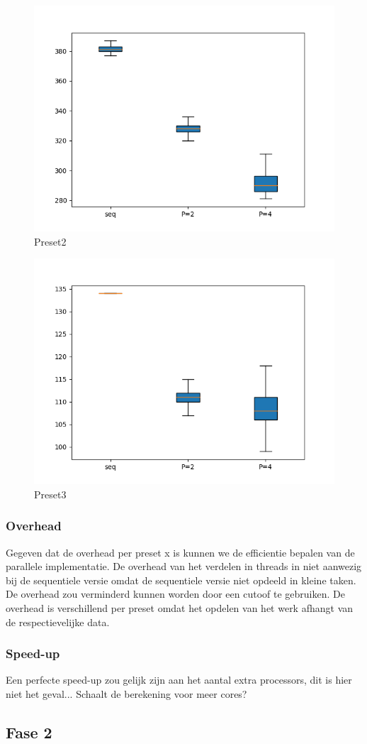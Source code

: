\documentclass[]{article}
\begin{document}
\begin{figure}
	\centering
	\includegraphics[width=0.7\linewidth]{Preset_2}
	\caption[Preset1]{Preset2}
	\label{fig:preset2}
\end{figure}

\begin{figure}
	\centering
	\includegraphics[width=0.7\linewidth]{Preset_3}
	\caption[Preset1]{Preset3}
	\label{fig:preset3}
\end{figure}

\subsubsection{Overhead}Gegeven dat de overhead per preset x is kunnen we de efficientie bepalen van de parallele implementatie.
De overhead van het verdelen in threads in niet aanwezig bij de sequentiele versie omdat de sequentiele versie niet opdeeld in kleine taken.
De overhead zou verminderd kunnen worden door een cutoof te gebruiken.
De overhead is verschillend per preset omdat het opdelen van het werk afhangt van de respectievelijke data.
\subsubsection{Speed-up}
Een perfecte speed-up zou gelijk zijn aan het aantal extra processors, dit is hier niet het geval...
Schaalt de berekening voor meer cores?
\subsection{Fase 2}
\end{document}
